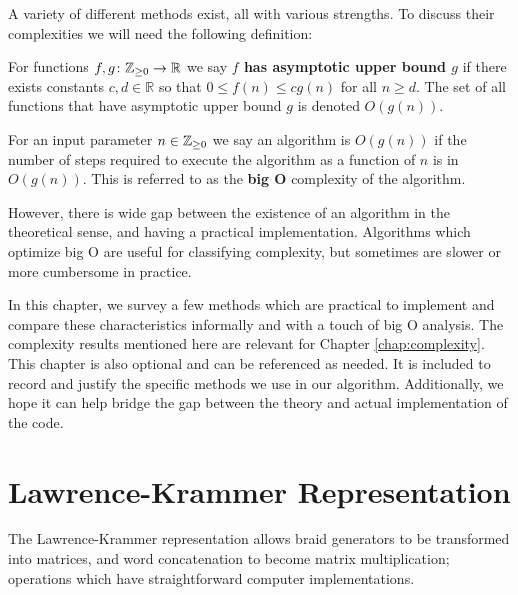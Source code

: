 \documentclass[12pt]{thesis}
\begin{document}
A variety of different methods exist, all with various strengths.
To discuss their complexities we will need the following definition:
\begin{definition}
    \cite{clrs}
    For functions $f, g \colon \mathbb{Z}_{\geq 0} \rightarrow \mathbb{R}$ 
    we say \textbf{$f$ has asymptotic upper bound $g$} if
    there exists constants $c, d \in \mathbb{R}$
    so that $0 \leq f(n) \leq cg(n)$ for all $n \geq d$.
    The set of all functions that have asymptotic upper bound $g$
    is denoted $O(g(n))$.
\end{definition}
\begin{definition}
    For an input parameter $n \in \mathbb{Z}_{\geq 0}$
    we say an algorithm is $O(g(n))$
    if the number of steps required to execute
    the algorithm as a function of $n$ is in $O(g(n))$.
    This is referred to as the \textbf{big O} complexity
    of the algorithm.
\end{definition}

However, there is wide gap between the existence of an algorithm
in the theoretical sense, and having a practical implementation.
Algorithms which optimize big O are useful for classifying complexity,
but sometimes are slower or more cumbersome in practice. 

In this chapter, we survey a few methods which are practical to implement
and compare these characteristics informally and with a touch of big O analysis.
The complexity results mentioned here are relevant for Chapter \ref{chap:complexity}.
This chapter is also optional and can be referenced as needed.
It is included to record and justify the specific methods we use in our algorithm.
Additionally, we hope it can help bridge the gap between the theory 
and actual implementation of the code. 

\section{Lawrence-Krammer Representation}

The Lawrence-Krammer representation allows braid
generators to be transformed into matrices,
and word concatenation to become matrix multiplication;
operations which have straightforward computer implementations.
\end{document}
